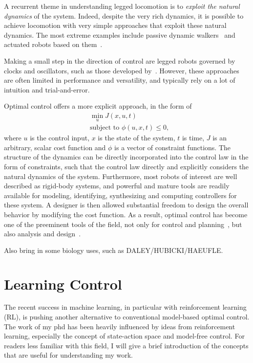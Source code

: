 A recurrent theme in understanding legged locomotion is to \emph{exploit the natural dynamics} of the system. Indeed, despite the very rich dynamics, it is possible to achieve locomotion with very simple approaches that exploit these natural dynamics.
The most extreme examples include passive dynamic walkers~\cite{mcgeer1990passive} and actuated robots based on them~\cite{bhounsule2012design,wisse2006design,tedrake2005learning}. \par
Making a small step in the direction of control are legged robots governed by clocks and oscillators, such as those developed by~\textcite{sprowitz2013towards,buchli2006resonance,altendorfer2001rhex,owaki2013simple}. However, these approaches are often limited in performance and versatility, and typically rely on a lot of intuition and trial-and-error. \par
Optimal control offers a more explicit approach, in the form of 
\begin{align}
& \min_{u} J(x, u, t) \\
& \text{subject to } \phi(u, x, t) \leq 0,
\end{align}
where $u$ is the control input, $x$ is the state of the system, $t$ is time, $J$ is an arbitrary, scalar cost function and $\phi$ is a vector of constraint functions. The structure of the dynamics can be directly incorporated into the control law in the form of constraints, such that the control law directly and explicitly considers the natural dynamics of the system. Furthermore, most robots of interest are well described as rigid-body systems, and powerful and mature tools are readily available for modeling, identifying, synthesizing and computing controllers for these system. A designer is then allowed substantial freedom to design the overall behavior by modifying the cost function. As a result, optimal control has become one of the preeminent tools of the field, not only for control and planning~\cite{koolen2016design,ponton2016convex,winkler2018gait,mombaur_2009,deits2014footstep}, but also analysis and design~\cite{ha2018codesign,takahashi2019spring,mombaur_2009,Yesilevskiy_2018,Birn-Jeffery3786}.


Also bring in some biology uses, such as DALEY/HUBICKI/HAEUFLE.


\section{Learning Control}

The recent success in machine learning, in particular with reinforcement learning (RL), is pushing another alternative to conventional model-based optimal control. The work of my phd has been heavily influenced by ideas from reinforcement learning, especially the concept of state-action space and model-free control. For readers less familiar with this field, I will give a brief introduction of the concepts that are useful for understanding my work.

